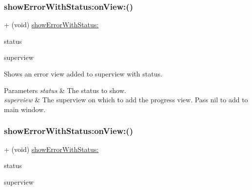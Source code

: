\subsubsection{\texorpdfstring{show\+Error\+With\+Status\+:on\+View\+:()}{showErrorWithStatus:onView:()}\hspace{0.1cm}{\footnotesize\ttfamily [1/3]}}
{\footnotesize\ttfamily + (void) \mbox{\hyperlink{interface_k_v_n_progress_a3125f228cdd6685e4cf74fa960bfa234}{show\+Error\+With\+Status\+:}} \begin{DoxyParamCaption}\item[{(N\+S\+String $\ast$)}]{status }\item[{onView:(U\+I\+View $\ast$)}]{superview }\end{DoxyParamCaption}}

Shows an error view added to {\ttfamily superview} with {\ttfamily status}. 
\begin{DoxyParams}{Parameters}
{\em status} & The status to show. \\
\hline
{\em superview} & The superview on which to add the progress view. Pass {\ttfamily nil} to add to main window. \\
\hline
\end{DoxyParams}
\mbox{\label{interface_k_v_n_progress_a639e363838fbea785adea0aa9b39ca39}} 
\subsubsection{\texorpdfstring{show\+Error\+With\+Status\+:on\+View\+:()}{showErrorWithStatus:onView:()}\hspace{0.1cm}{\footnotesize\ttfamily [2/3]}}
{\footnotesize\ttfamily + (void) \mbox{\hyperlink{interface_k_v_n_progress_a3125f228cdd6685e4cf74fa960bfa234}{show\+Error\+With\+Status\+:}} \begin{DoxyParamCaption}\item[{(N\+S\+String $\ast$)}]{status }\item[{onView:(U\+I\+View $\ast$)}]{superview }\end{DoxyParamCaption}}


